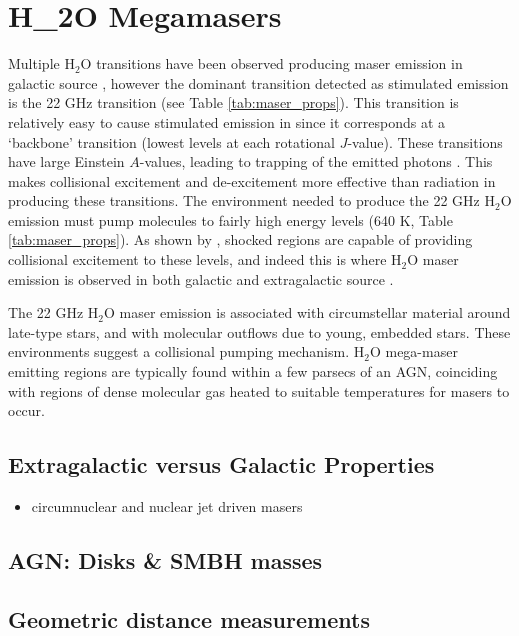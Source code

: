 \section{H_2O Megamasers}
\label{sec:h2o_mm}

Multiple H$_2$O transitions have been observed producing maser emission in galactic source \citep{Elitzur_1992}, however the dominant transition detected as stimulated emission is the 22 GHz transition (see Table \ref{tab:maser_props}). This transition is relatively easy to cause stimulated emission in since it corresponds at a `backbone' transition (lowest levels at each rotational $J$-value). These transitions have large Einstein $A$-values, leading to trapping of the emitted photons \citep{stahler_palla_2004}. This makes collisional excitement and de-excitement more effective than radiation in producing these transitions. The environment needed to produce the 22 GHz H$_2$O emission must pump molecules to fairly high energy levels (640 K, Table \ref{tab:maser_props}). As shown by \citet{stahler_palla_2004}, shocked regions are capable of providing collisional excitement to these levels, and indeed this is where H$_2$O maser emission is observed in both galactic and extragalactic source \citep{Elitzur_1992, lo2005}. 

The 22 GHz H$_2$O maser emission is associated with circumstellar material around late-type stars, and with molecular outflows due to young, embedded stars. These environments suggest a collisional pumping mechanism. H$_2$O mega-maser emitting regions are typically found within a few parsecs of an AGN, coinciding with regions of dense molecular gas heated to suitable temperatures for masers to occur. 

\subsection{Extragalactic versus Galactic Properties}
\label{sub:h2o_props}

\begin{itemize}
\item circumnuclear and nuclear jet driven masers
\end{itemize}

\subsection{AGN: Disks \& SMBH masses}
\label{sub:h20_smbh_mass}

\subsection{Geometric distance measurements}
\label{sub:h2o_distance}



